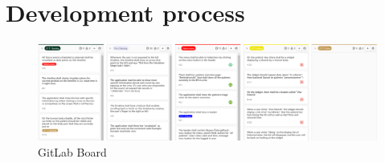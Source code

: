 \appendix

\section{Development process}
\label{sec:dev-process-appendix}
 \begin{figure}[h!]
     \centering\includegraphics[width=1 \linewidth]{figures/Gitlab board.PNG}
     \caption{GitLab Board}
\end{figure}
